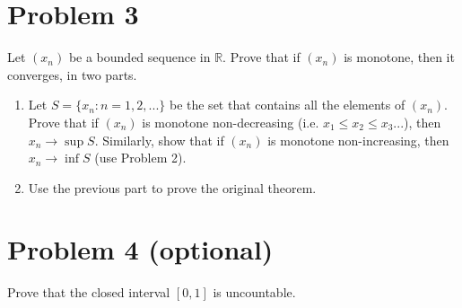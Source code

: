 \documentclass[11pt]{article}
\newcommand{\R}{\ensuremath{\mathbb R}}
\theoremstyle{plain}
\theoremstyle{definition}
\theoremstyle{remark}
\begin{document}
\section*{Problem 3}

Let $(x_n)$ be a bounded sequence in $\R$. Prove that if $(x_n)$ is monotone, then it converges, in two parts.
\begin{enumerate}
    \item Let $S = \{x_n : n = 1, 2, ...\}$ be the set that contains all the elements of $(x_n)$. Prove that if $(x_n)$ is monotone non-decreasing (i.e. $x_1 \leq x_2 \leq x_3 ...$), then $x_n \rightarrow \sup S$. Similarly, show that if $(x_n)$ is monotone non-increasing, then $x_n \rightarrow \inf S$ (use Problem 2).
    \item Use the previous part to prove the original theorem.
\end{enumerate}

\section*{Problem 4 (optional)}

Prove that the closed interval $[0,1]$ is uncountable.




% 
% 

\end{document}
